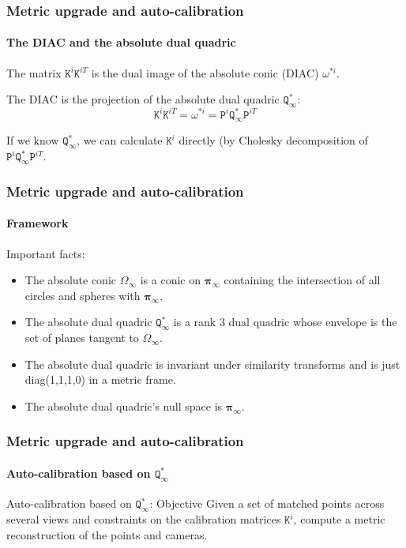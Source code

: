 \documentclass[aspectratio=169]{beamer}
\renewcommand{\vec}[1]{\boldsymbol{#1}}
\newcommand{\mat}[1]{\mathtt{#1}}
\begin{document}
\begin{frame}
\frametitle{Metric upgrade and auto-calibration}
\framesubtitle{The DIAC and the absolute dual quadric}

The matrix $\mat{K}^i\mat{K}^{iT}$ is the \alert{dual image of the
    absolute conic (DIAC)} $\mat{\omega}^{*i}$.

\medskip

The DIAC is the projection of the \alert{absolute dual quadric}
$\mat{Q}_{\infty}^*$:
\begin{equation*}
\mat{K}^i\mat{K}^{iT} = 
\mat{\omega}^{*i} = \mat{P}^i\mat{Q}^*_{\infty}\mat{P}^{iT}
\end{equation*}

\medskip

If we know $\mat{Q}^*_{\infty}$, we can calculate $\mat{K}^i$ directly
(by Cholesky decomposition of $\mat{P}^i\mat{Q}^*_{\infty}\mat{P}^{iT}$.

\end{frame}


\begin{frame}
\frametitle{Metric upgrade and auto-calibration}
\framesubtitle{Framework}

Important facts:
\begin{itemize}
\item The \alert{absolute conic} $\mat{\Omega}_{\infty}$
  is a conic on $\vec{\pi}_{\infty}$ containing
  the intersection of all circles and spheres with $\vec{\pi}_{\infty}$.
\item The \alert{absolute dual quadric} $\mat{Q}_{\infty}^*$ is a rank
  3 dual quadric whose envelope is the set of
  planes tangent to $\mat{\Omega}_{\infty}$.
\item The absolute dual quadric is invariant under similarity transforms
  and is just diag(1,1,1,0) in a metric frame.
\item The absolute dual quadric's null space is $\vec{\pi}_{\infty}$.
\end{itemize}

\end{frame}


\begin{frame}
\frametitle{Metric upgrade and auto-calibration}
\framesubtitle{Auto-calibration based on $\mat{Q}_{\infty}^*$}

\begin{block}{Auto-calibration based on $\mat{Q}_{\infty}^*$: Objective}
Given a set of matched points across several views and constraints on
the calibration matrices $\mat{K}^i$, compute a metric reconstruction of the
points and cameras.
\end{block}

\end{frame}
\end{document}
